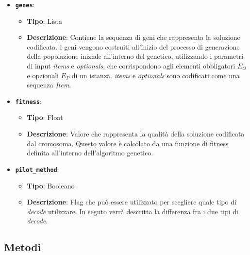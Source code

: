 \begin{itemize}
    \item \textbf{\texttt{genes}}:
    \begin{itemize}
        \item \textbf{Tipo}: Lista
        \item \textbf{Descrizione}: Contiene la sequenza di geni che rappresenta la soluzione codificata. I geni vengono costruiti all'inizio del processo di generazione della popolazione iniziale all'interno del genetico, utilizzando i parametri di input \emph{items} e \emph{optionals}, che corrispondono agli elementi obbligatori \( E_O \) e opzionali \( E_P \) di un istanza. \emph{items} e \emph{optionals} sono codificati come una sequenza \emph{Item}.
    \end{itemize}
    \item \textbf{\texttt{fitness}}:
    \begin{itemize}
        \item \textbf{Tipo}: Float
        \item \textbf{Descrizione}: Valore che rappresenta la qualità della soluzione codificata dal cromosoma. Questo valore è calcolato da una funzione di fitness definita all'interno dell'algoritmo genetico.
    \end{itemize}
    \item \textbf{\texttt{pilot\_method}}:
    \begin{itemize}
        \item \textbf{Tipo}: Booleano
        \item \textbf{Descrizione}: Flag che può essere utilizzato per scegliere quale tipo di \emph{decode} utilizzare. In seguto verrà descritta la differenza fra i due tipi di \emph{decode}.
    \end{itemize}
\end{itemize}

\subsection{Metodi}

